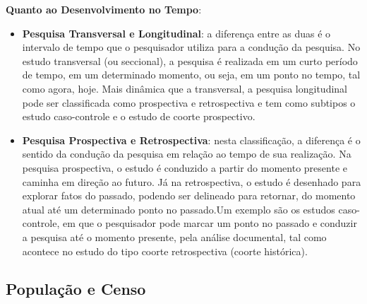 \textbf{Quanto ao Desenvolvimento no Tempo}: 

\begin{itemize}
\item \textbf{Pesquisa Transversal e Longitudinal}: a diferença entre as duas é o intervalo de tempo que o pesquisador utiliza para a condução da pesquisa. No estudo transversal (ou seccional), a pesquisa é realizada em um curto período de tempo, em um determinado momento, ou seja, em um ponto no tempo, tal como agora, hoje. Mais dinâmica que a transversal, a pesquisa longitudinal pode ser classificada como prospectiva e retrospectiva e tem como subtipos o estudo caso-controle e o estudo de coorte prospectivo. 
\item \textbf{Pesquisa Prospectiva e Retrospectiva}: nesta classificação, a diferença é o sentido da condução da pesquisa em relação ao tempo de sua realização. Na pesquisa prospectiva, o estudo é conduzido a partir do momento presente e caminha em direção ao futuro. Já na retrospectiva, o estudo é desenhado para explorar fatos do passado, podendo ser delineado para retornar, do momento atual até um determinado ponto no passado.Um exemplo são os estudos caso-controle, em que o pesquisador pode marcar um ponto no passado e conduzir a pesquisa até o momento presente, pela  análise documental, tal como acontece no estudo do tipo coorte retrospectiva (coorte histórica). 
\end{itemize}

\subsection{População e Censo}

